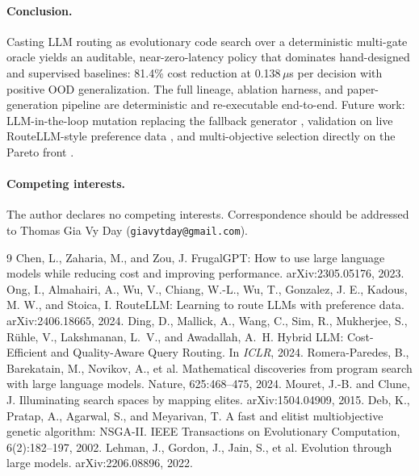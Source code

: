 \documentclass[11pt]{article}
\begin{document}
\paragraph{Conclusion.} Casting LLM routing as evolutionary code search over a deterministic multi-gate oracle yields an auditable, near-zero-latency policy that dominates hand-designed and supervised baselines: 81.4\% cost reduction at 0.138\,$\mu$s per decision with positive OOD generalization. The full lineage, ablation harness, and paper-generation pipeline are deterministic and re-executable end-to-end. Future work: LLM-in-the-loop mutation replacing the fallback generator \cite{elm,funsearch}, validation on live RouteLLM-style preference data \cite{routellm}, and multi-objective selection directly on the Pareto front \cite{nsgaii}.
\paragraph{Competing interests.} The author declares no competing interests. Correspondence should be addressed to Thomas Gia Vy Day (\texttt{giavytday@gmail.com}).

\begin{thebibliography}{9}
 Chen, L., Zaharia, M., and Zou, J. FrugalGPT: How to use large language models while reducing cost and improving performance. arXiv:2305.05176, 2023.
 Ong, I., Almahairi, A., Wu, V., Chiang, W.-L., Wu, T., Gonzalez, J. E., Kadous, M. W., and Stoica, I. RouteLLM: Learning to route LLMs with preference data. arXiv:2406.18665, 2024.
 Ding, D., Mallick, A., Wang, C., Sim, R., Mukherjee, S., R{\"u}hle, V., Lakshmanan, L.~V., and Awadallah, A.~H. Hybrid LLM: Cost-Efficient and Quality-Aware Query Routing. In \emph{ICLR}, 2024.
 Romera-Paredes, B., Barekatain, M., Novikov, A., et al. Mathematical discoveries from program search with large language models. Nature, 625:468--475, 2024.
 Mouret, J.-B. and Clune, J. Illuminating search spaces by mapping elites. arXiv:1504.04909, 2015.
 Deb, K., Pratap, A., Agarwal, S., and Meyarivan, T. A fast and elitist multiobjective genetic algorithm: NSGA-II. IEEE Transactions on Evolutionary Computation, 6(2):182--197, 2002.
 Lehman, J., Gordon, J., Jain, S., et al. Evolution through large models. arXiv:2206.08896, 2022.
\end{thebibliography}
\end{document}
